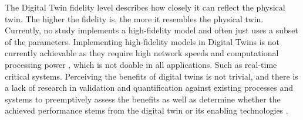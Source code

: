 The Digital Twin fidelity level describes how closely it can reflect the physical twin. The higher the fidelity is, the more it resembles the physical twin. Currently, no study implements a high-fidelity model and often just uses a subset of the parameters. Implementing high-fidelity models in Digital Twins is not currently achievable as they require high network speeds and computational processing power \cite{JONES202036}, which is not doable in all applications. Such as real-time critical systems. Perceiving the benefits of digital twins is not trivial, and there is a lack of research in validation and quantification against existing processes and systems to preemptively assess the benefits as well as determine whether the achieved performance stems from the digital twin or its enabling technologies \cite{JONES202036, VANDINTER2022107008}.



 

 